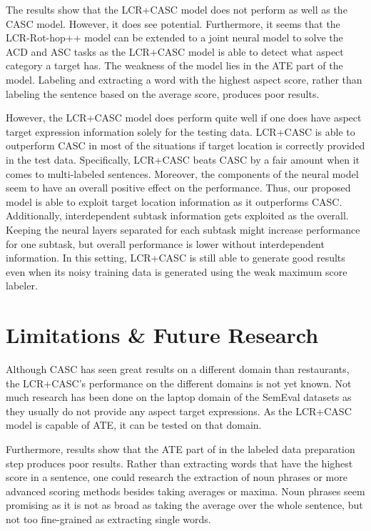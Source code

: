 \documentclass[american, oneside]{ecsgdp}
\begin{document}
The results show that the LCR+CASC model does not perform as well as the CASC model. However, it does see potential. Furthermore, it seems that the LCR-Rot-hop++ model can be extended to a joint neural model to solve the ACD and ASC tasks as the LCR+CASC model is able to detect what aspect category a target has. The weakness of the model lies in the ATE part of the model. Labeling and extracting a word with the highest aspect score, rather than labeling the sentence based on the average score, produces poor results.

However, the LCR+CASC model does perform quite well if one does have aspect target expression information solely for the testing data. LCR+CASC is able to outperform CASC in most of the situations if target location is correctly provided in the test data. Specifically, LCR+CASC beats CASC by a fair amount when it comes to multi-labeled sentences. Moreover, the components of the neural model seem to have an overall positive effect on the performance. Thus, our proposed model is able to exploit target location information as it outperforms CASC. Additionally, interdependent subtask information gets exploited as the overall. Keeping the neural layers separated for each subtask might increase performance for one subtask, but overall performance is lower without interdependent information. In this setting, LCR+CASC is still able to generate good results even when its noisy training data is generated using the weak maximum score labeler.

\section{Limitations \& Future Research} \label{sec:limitation}
Although CASC has seen great results on a different domain than restaurants, the LCR+CASC's performance on the different domains is not yet known. Not much research has been done on the laptop domain of the SemEval datasets as they usually do not provide any aspect target expressions. As the LCR+CASC model is capable of ATE, it can be tested on that domain. 

Furthermore, results show that the ATE part of in the labeled data preparation step produces poor results. Rather than extracting words that have the highest score in a sentence, one could research the extraction of noun phrases or more advanced scoring methods besides taking averages or maxima. Noun phrases seem promising as it is not as broad as taking the average over the whole sentence, but not too fine-grained as extracting single words.
\end{document}

